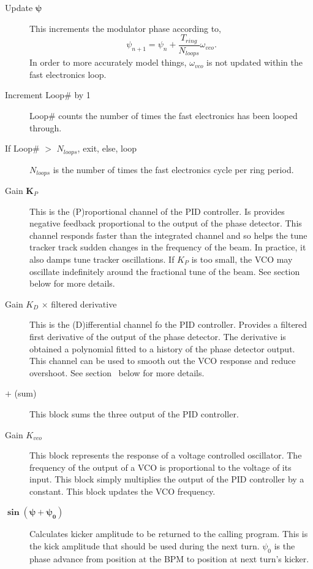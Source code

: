 \begin{description}
\item[Update $\boldsymbol{\psi}$] This increments the modulator phase according to,
\begin{equation}
\psi_{n+1}=\psi_n+\frac{T_{ring}}{N_{loops}}\omega_{vco}\textrm{.}
\end{equation}
In order to more accurately model things,
$\omega_{vco}$ is not updated within the fast electronics loop.

\item[Increment Loop\# by 1]  
Loop\# counts the number of times the fast electronics has been looped
through.

\item[If Loop\# $>$ $N_{loops}$, exit, else, loop]  
$N_{loops}$ is the number of times the fast electronics cycle per ring
period.

\item[Gain $\boldsymbol K_P$] 
This is the (P)roportional channel of the PID controller.  Is provides
negative feedback proportional to the output of the phase detector.
This channel responds faster than the integrated channel and so helps
the tune tracker track sudden changes in the frequency of the beam.
In practice, it also damps tune tracker oscillations.  If $K_P$ is too
small, the VCO may oscillate indefinitely around the fractional tune
of the beam.  See section~ below for more details.

\item[Gain $K_D$ $\times$ filtered derivative]  
This is the (D)ifferential channel fo the PID controller.  Provides a
filtered first derivative of the output of the phase detector.  The
derivative is obtained a polynomial fitted to a history of the phase
detector output.  This channel can be used to smooth out the VCO
response and reduce overshoot.  See section~ below for
more details.

\item[$\boldsymbol +$ (sum)]  
This block sums the three output of the PID controller.

\item[Gain $K_{vco}$] 
This block represents the response of a voltage controlled oscillator.
The frequency of the output of a VCO is proportional to the voltage of
its input.  This block simply multiplies the output of the PID
controller by a constant.  This block updates the VCO frequency.

\item[$\boldsymbol{\sin\left(\psi+\psi_0\right)}$]  
Calculates kicker amplitude to be returned to the calling program.
This is the kick amplitude that should be used during the next turn.
$\psi_0$ is the phase advance from position at the BPM to position at
next turn's kicker.

\end{description}

